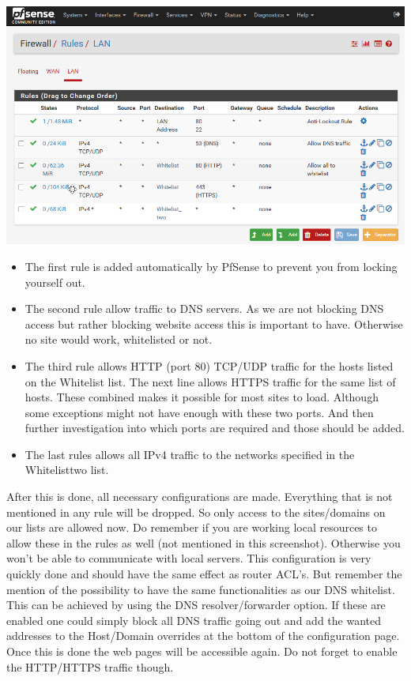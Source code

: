 \includegraphics[width=\textwidth]{img/Pfsense_Rules.png}
\begin{itemize}
\item The first rule is added automatically by PfSense to prevent you from locking yourself out.
\item The second rule allow traffic to DNS servers. As we are not blocking DNS access but rather blocking website access this is important to have. Otherwise no site would work, whitelisted or not.
\item The third rule allows HTTP (port 80) TCP/UDP traffic for the hosts listed on the Whitelist list.  The next line allows HTTPS traffic for the same list of hosts. These combined makes it possible for most sites to load. Although some exceptions might not have enough with these two ports. And then further investigation into which ports are required and those should be added.
\item The last rules allows all IPv4 traffic to the networks specified in the Whitelist\textunderscore two list. 
\end{itemize}
After this is done, all necessary configurations are made. Everything that is not mentioned in any rule will be dropped. So only access to the sites/domains on our lists are allowed now. Do remember if you are working local resources to allow these in the rules as well (not mentioned in this screenshot). Otherwise you won't be able to communicate with local servers. This configuration is very quickly done and should have the same effect as router ACL's. But remember the mention of the possibility to have the same functionalities as our DNS whitelist. This can be achieved by using the DNS resolver/forwarder option. If these are enabled one could simply block all DNS traffic going out and add the wanted addresses to the Host/Domain overrides at the bottom of the configuration page. Once this is done the web pages will be accessible again. Do not forget to enable the HTTP/HTTPS traffic though.
